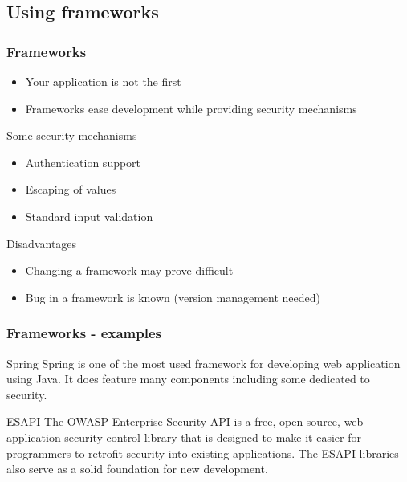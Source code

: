 \subsection{Using frameworks}

\begin{frame}
\frametitle{Frameworks}
\begin{itemize}
\item Your application is not the first
\item Frameworks ease development while providing security mechanisms
\end{itemize}
\begin{block}{Some security mechanisms}
\begin{itemize}
\item Authentication support
\item Escaping of values
\item Standard input validation
\end{itemize}
\end{block}
\begin{block}{Disadvantages}
\begin{itemize}
\item Changing a framework may prove difficult
\item Bug in a framework is known
	(version management needed)
\end{itemize}
\end{block}
\end{frame}

\begin{frame}
\frametitle{Frameworks - examples}

\begin{exampleblock}{Spring}
Spring is one of the most used framework for developing web application using
Java. It does feature many components including some dedicated to security.
\end{exampleblock}

\begin{exampleblock}{ESAPI}
The OWASP Enterprise Security API is a free, open source, web application
security control library that is designed to make it easier for programmers
to retrofit security into existing applications.
The ESAPI libraries also serve as a solid foundation for new development.
\end{exampleblock}

\end{frame}

